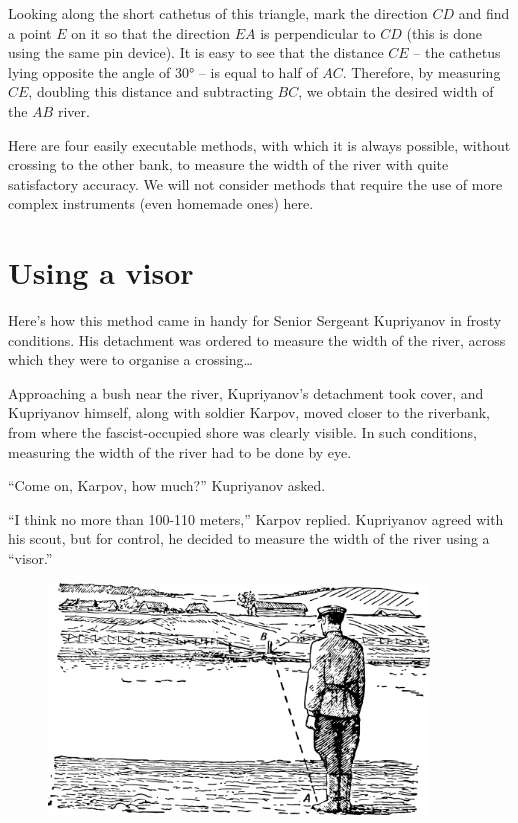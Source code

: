 \begin{enumerate}
\begin{marginfigure}[-2cm]
\end{marginfigure}
Looking along the short cathetus of this triangle, mark the direction $CD$ and find a point $E$ on it so that the direction $EA$ is perpendicular to $CD$ (this is done using the same pin device). It is easy to see that the distance $CE$ -- the cathetus lying opposite the angle of \ang{30} -- is equal to half of $AC$. Therefore, by measuring $CE$, doubling this distance and subtracting $BC$, we obtain the desired width of the $AB$ river.

\end{enumerate}

Here are four easily executable methods, with which it is always possible, without crossing to the other bank, to measure the width of the river with quite satisfactory accuracy. We will not consider methods that require the use of more complex instruments (even homemade ones) here.

\section{Using a visor}
\label{sec-2.2}

Here's how this method came in handy for Senior Sergeant Kupriyanov in frosty conditions. His detachment was ordered to measure the width of the river, across which they were to organise a crossing\ldots{}

Approaching a bush near the river, Kupriyanov's detachment took cover, and Kupriyanov himself, along with soldier Karpov, moved closer to the riverbank, from where the fascist-occupied shore was clearly visible. In such conditions, measuring the width of the river had to be done by eye.

``Come on, Karpov, how much?'' Kupriyanov asked.

``I think no more than 100-110 meters,'' Karpov replied. Kupriyanov agreed with his scout, but for control, he decided to measure the width of the river using a ``visor.''

\begin{figure}[h!]
\centering
\includegraphics[width=0.9\textwidth]{figures/ch-02/fig-032.pdf}
\end{figure}

